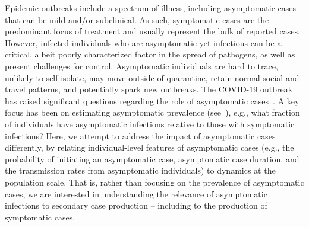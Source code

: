 Epidemic outbreaks include a spectrum of illness, including
asymptomatic cases that can be mild and/or subclinical.
As such, symptomatic cases are the predominant focus of treatment and usually represent
the bulk of reported cases. However, infected individuals who are asymptomatic
yet infectious can be a critical, albeit poorly characterized
factor in the spread of pathogens, as well as 
present challenges for control.
Asymptomatic individuals
are hard to trace, unlikely to self-isolate,
may move outside of quarantine,  
retain normal social and travel patterns, and potentially spark new
outbreaks.
The COVID-19 outbreak has raised significant
questions regarding the role of asymptomatic cases~\citep{fauci_nejm2020}.
A key focus has been on estimating asymptomatic prevalence (see~\citep{mizumoto_2020}), e.g., what fraction of individuals have asymptomatic infections relative to those with symptomatic infections?
Here, we attempt to address the impact of asymptomatic cases differently, by relating 
individual-level features of asymptomatic cases (e.g., the probability
of initiating an asymptomatic case, asymptomatic case duration, and
the transmission rates from asymptomatic individuals) to dynamics at the
population scale. That is, rather than focusing on the prevalence
of asymptomatic cases, we are interested in understanding the
relevance of asymptomatic infections to secondary case production -- including
to the production of symptomatic cases.

